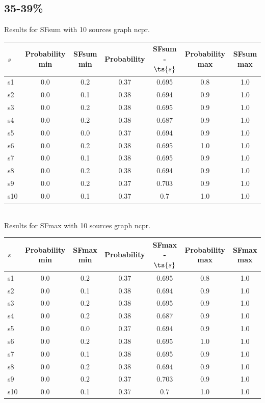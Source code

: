 \documentclass{article}
\begin{document}
\newpage

\subsection{35-39\%}

\noindent Results for SFsum with 10 sources graph ncpr.

\noindent\begin{tabular}{|l|c|c|c|c|c|c|}
\hline
$s$& Probability min & SFsum min & Probability & SFsum - $\ts{s}$ & Probability max & SFsum max\\
\hline
s1 &0.0 & 0.2 & 0.37 & 0.695 & 0.8 & 1.0\\
\hline
s2 &0.0 & 0.1 & 0.38 & 0.694 & 0.9 & 1.0\\
\hline
s3 &0.0 & 0.2 & 0.38 & 0.695 & 0.9 & 1.0\\
\hline
s4 &0.0 & 0.2 & 0.38 & 0.687 & 0.9 & 1.0\\
\hline
s5 &0.0 & 0.0 & 0.37 & 0.694 & 0.9 & 1.0\\
\hline
s6 &0.0 & 0.2 & 0.38 & 0.695 & 1.0 & 1.0\\
\hline
s7 &0.0 & 0.1 & 0.38 & 0.695 & 0.9 & 1.0\\
\hline
s8 &0.0 & 0.2 & 0.38 & 0.694 & 0.9 & 1.0\\
\hline
s9 &0.0 & 0.2 & 0.37 & 0.703 & 0.9 & 1.0\\
\hline
s10 &0.0 & 0.1 & 0.37 & 0.7 & 1.0 & 1.0\\
\hline
\end{tabular}\\

\noindent Results for SFmax with 10 sources graph ncpr.

\noindent\begin{tabular}{|l|c|c|c|c|c|c|}
\hline
$s$& Probability min & SFmax min & Probability & SFmax - $\ts{s}$ & Probability max & SFmax max\\
\hline
s1 &0.0 & 0.2 & 0.37 & 0.695 & 0.8 & 1.0\\
\hline
s2 &0.0 & 0.1 & 0.38 & 0.694 & 0.9 & 1.0\\
\hline
s3 &0.0 & 0.2 & 0.38 & 0.695 & 0.9 & 1.0\\
\hline
s4 &0.0 & 0.2 & 0.38 & 0.687 & 0.9 & 1.0\\
\hline
s5 &0.0 & 0.0 & 0.37 & 0.694 & 0.9 & 1.0\\
\hline
s6 &0.0 & 0.2 & 0.38 & 0.695 & 1.0 & 1.0\\
\hline
s7 &0.0 & 0.1 & 0.38 & 0.695 & 0.9 & 1.0\\
\hline
s8 &0.0 & 0.2 & 0.38 & 0.694 & 0.9 & 1.0\\
\hline
s9 &0.0 & 0.2 & 0.37 & 0.703 & 0.9 & 1.0\\
\hline
s10 &0.0 & 0.1 & 0.37 & 0.7 & 1.0 & 1.0\\
\hline
\end{tabular}\\
\end{document}
